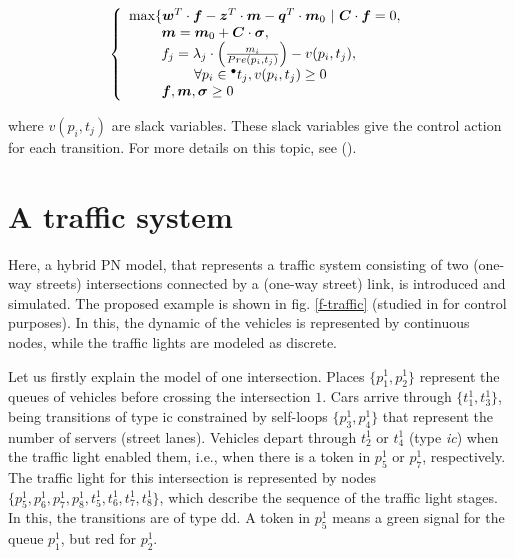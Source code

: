 \begin{equation}
\left\{
\begin{array}{l}
\max \{ \b{w}^T \cdot \b{f} - \b{z}^T \cdot \b{\m} - \b{q}^T \cdot \mo \ | \ \b{C} \cdot \b{f} = 0, \\
\ \ \ \ \ \ \ \b{m} = \mo + \b{C} \cdot \b{\sigma}, \\
\ \ \ \ \ \ \ f_j = \lambda_j \cdot \left( \frac{m_i}{Pre(p_i,t_j)} \right) - v(p_i,t_j), \\
\ \ \ \ \ \ \  \ \ \ \ \ \ \ \forall p_i \in \preset{t_j}, v(p_i,t_j) \geq 0 \\
\ \ \ \ \ \ \ \b{f}, \b{m}, \b{\sigma} \geq 0
\end{array}
\right.
\end{equation}

where $v(p_i,t_j)$ are slack variables. These slack variables give the control action for each transition. For more details on this topic, see (\cite{ARMaRaReSi08}).

\section{A traffic system}
\label{s:traffic}

Here, a hybrid PN model, that represents a traffic system consisting
of two (one-way streets) intersections connected by a (one-way
street) link, is introduced and simulated. The proposed example is
shown in fig. \ref{f-traffic} (studied in \cite{IPVaSuBoSi10} for
control purposes). In this, the dynamic of the vehicles is
represented by continuous nodes, while the traffic lights are
modeled as discrete.

Let us firstly explain the model of one intersection. Places
$\{p_1^1,p_2^1\}$ represent the queues of vehicles before crossing
the intersection $1$. Cars arrive through $\{t_1^1,t_3^1\}$, being
transitions of type ic constrained by self-loops $\{p_3^1,p_4^1\}$
that represent the number of servers (street lanes). Vehicles depart
through $t_2^1$ or $t_4^1$ (type \emph{ic}) when the traffic light enabled
them, i.e., when there is a token in $p_5^1$ or $p_7^1$,
respectively. The traffic light for this intersection is represented
by nodes $\{p_5^1,p_6^1,p_7^1,p_8^1,t_5^1,t_6^1,t_7^1,t_8^1\}$,
which describe the sequence of the traffic light stages. In this,
the transitions are of type dd. A token in $p_5^1$ means a green
signal for the queue $p_1^1$, but red for $p_2^1$.

